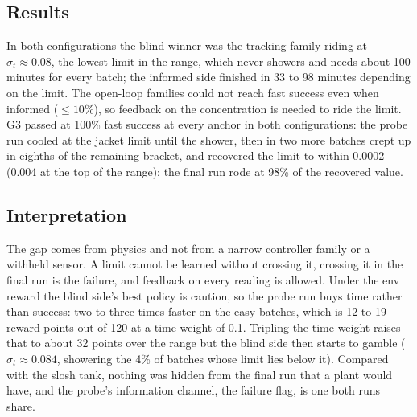 \documentclass[11pt,a4paper]{article}
\begin{document}
\subsection*{Results}

\begin{center}\small
{}
\end{center}

In both configurations the blind winner was the tracking family riding at
$\sigma_t\approx 0.08$, the lowest limit in the range, which never showers and
needs about 100 minutes for every batch; the informed side finished in 33 to
98 minutes depending on the limit. The open-loop families could not reach fast
success even when informed ($\le 10\%$), so feedback on the concentration is
needed to ride the limit. G3 passed at 100\% fast success at every anchor in
both configurations: the probe run cooled at the jacket limit until the shower,
then in two more batches crept up in eighths of the remaining bracket, and
recovered the limit to within 0.0002 (0.004 at the top of the range); the final
run rode at 98\% of the recovered value.

\subsection*{Interpretation}

The gap comes from physics and not from a narrow controller family or a
withheld sensor. A limit cannot be learned without crossing it, crossing it in
the final run is the failure, and feedback on every reading is allowed. Under
the env reward the blind side's best policy is caution, so the probe run buys
time rather than success: two to three times faster on the easy batches, which
is 12 to 19 reward points out of 120 at a time weight of 0.1. Tripling the time
weight raises that to about 32 points over the range but the blind side then
starts to gamble ($\sigma_t\approx 0.084$, showering the 4\% of batches whose
limit lies below it). Compared with the slosh tank, nothing was hidden from the
final run that a plant would have, and the probe's information channel, the
failure flag, is one both runs share.
\end{document}
